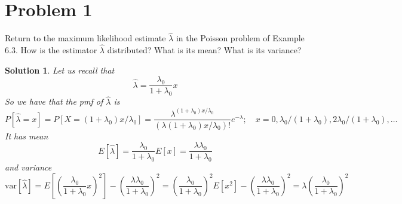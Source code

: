 \documentclass[a4paper]{article}
\newtheorem*{sol}{Solution}
\begin{document}
\section*{Problem 1}%
Return to the maximum likelihood estimate $\hat{\lambda}$ in the Poisson problem of Example 6.3. How is the estimator $\hat{\lambda}$ distributed? What is its mean? What is its variance?

\begin{sol}
  Let us recall that 
  \[
    \hat{\lambda} = \frac{\lambda_0}{1 + \lambda_0}x
  \]
  So we have that the pmf of $\hat{\lambda}$ is
  \[
    P[ \hat{\lambda} = x] = P[ X = (1+ \lambda_0)x/\lambda_0] = \frac{\lambda^{(1+\lambda_0)x/\lambda_0}}{(\lambda(1+\lambda_0)x/\lambda_0)!} e^{-\lambda}; \quad x= 0, \lambda_0/(1 + \lambda_0), 2\lambda_0/(1+\lambda_0), \dots \
  \]
  It has mean
  \[
    E[\hat{\lambda}] = \frac{\lambda_0}{1 + \lambda_0} E[x] = \frac{\lambda \lambda_0}{1 + \lambda_0}
  \]
  and variance
  \[
    \text{var}[\hat{\lambda}] = E \left[ \left(\frac{\lambda_0}{1 + \lambda_0}x\right)^2 \right] - \left(\frac{\lambda \lambda_0}{1 + \lambda_0}\right)^2 =  \left(\frac{\lambda_0}{1 + \lambda_0}  \right)^2 E[x^2] - \left(\frac{\lambda \lambda_0}{1 + \lambda_0}\right)^2  = \lambda \left( \frac{\lambda_0}{1 + \lambda_0} \right)^2
  \]
\end{sol}
\end{document}
